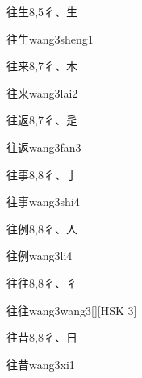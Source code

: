 \begin{entry}{往生}{8,5}{⼻、⽣}
  \begin{phonetics}{往生}{wang3sheng1}
  \end{phonetics}
\end{entry}

\begin{entry}{往来}{8,7}{⼻、⽊}
  \begin{phonetics}{往来}{wang3lai2}
  \end{phonetics}
\end{entry}

\begin{entry}{往返}{8,7}{⼻、⾡}
  \begin{phonetics}{往返}{wang3fan3}
  \end{phonetics}
\end{entry}

\begin{entry}{往事}{8,8}{⼻、⼅}
  \begin{phonetics}{往事}{wang3shi4}
  \end{phonetics}
\end{entry}

\begin{entry}{往例}{8,8}{⼻、⼈}
  \begin{phonetics}{往例}{wang3li4}
  \end{phonetics}
\end{entry}

\begin{entry}{往往}{8,8}{⼻、⼻}
  \begin{phonetics}{往往}{wang3wang3}[][HSK 3]
  \end{phonetics}
\end{entry}

\begin{entry}{往昔}{8,8}{⼻、⽇}
  \begin{phonetics}{往昔}{wang3xi1}
  \end{phonetics}
\end{entry}

